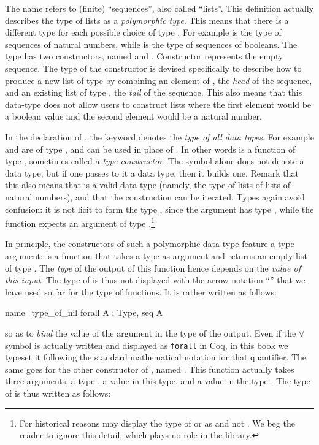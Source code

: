 The name  refers to (finite) ``sequences'', also called
``lists''. This definition actually describes the type
of lists as a {\em polymorphic type}. This means that there is a
different type  for each possible choice of type .  For example
 is the type of sequences of natural numbers, while
 is the type of sequences of booleans.
The type  has two
constructors, named  and . Constructor 
represents the empty sequence. The type of the
constructor  is devised specifically to describe how to produce a
new list of type  by combining an element of , the
\emph{head} of the sequence, and an
existing list of type , the \emph{tail} of the sequence.  This
also means that this data-type
does not allow users to construct lists where the first element would be
a boolean value and the second element would be a natural number.

In the declaration of , the keyword  denotes the
\emph{type of all data types}.  For example  and  are of type
, and can be used in place of .
In other words  is a function of type , sometimes
called a \emph{type constructor}.  The symbol  alone does not
denote a data type,
but if one passes to it a data type, then it builds one.  Remark
that this also means that  is a valid data type
(namely, the type of lists of lists of natural numbers), and
that the construction can be iterated.
Types again avoid confusion: it is not licit to form the type ,
since the argument  has type , while the function
 expects an argument of type .\footnote{For historical
reasons \Coq{} may display the type of  or  as 
and not .  We beg the reader to ignore this detail, which
plays no role in the \mcbMC{} library.}

In principle, the constructors of such a polymorphic data type feature
a type argument:
 is a function that takes a type  as argument and returns
an empty list of type . The \emph{type} of the output of
this function hence depends on the \emph{value of this input}. The
type of  is thus not displayed with the arrow notation
``'' that we have used so far for the type of
functions. It is rather written as follows:

\begin{coq}{name=type_of_nil}{}
  forall A : Type, seq A
\end{coq}
so as to \emph{bind} the value  of the argument in the type of
the output. Even if the $\forall$ symbol is actually written and displayed as
\verb+forall+ in Coq, in this book we typeset it following the standard
mathematical notation for that quantifier.
The same goes for the other constructor of , named
.  This function actually takes three arguments: a type ,
a value in this type, and a value in the type .  The type
of  is thus written as follows:

